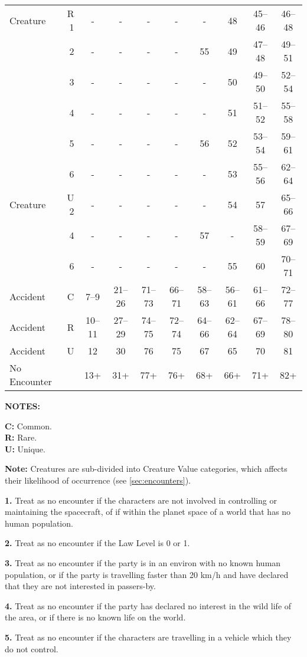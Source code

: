 \begin{table}[htbp]
{\begin{minipage}{5.25in}
\begin{tabular}{lrcccccccc}
\hline
Creature & R 1 & - & - & - & - & - & 48 & 45--46 & 46--48\\
\rowcolor{grey}
& 2 & - & - & - & - & 55 & 49 & 47--48 & 49--51\\
& 3 & - & - & - & - & - & 50 & 49--50 & 52--54\\
\rowcolor{grey}
& 4 & - & - & - & - & - & 51 & 51--52 & 55--58\\
& 5 & - & - & - & - & 56 & 52 & 53--54 & 59--61\\
\rowcolor{grey}
& 6 & - & - & - & - & - & 53 & 55--56 & 62--64\\
\hline
Creature & U 2 & - & - & - & - & - & 54 & 57 & 65--66\\
\rowcolor{grey}
& 4 & - & - & - & - & 57 & - & 58--59 & 67--69\\
& 6 & - & - & - & - & - & 55 & 60 & 70--71\\
\rowcolor{grey}
\hline
Accident\footnotemark[5]& C & 7--9 & 21--26 & 71--73 & 66--71 & 58--63 & 56--61 & 61--66 & 72--77\\
Accident & R & 10--11 & 27--29 & 74--75 & 72--74 & 64--66 & 62--64 & 67--69 & 78--80\\
\rowcolor{grey}
Accident & U & 12 & 30 & 76 & 75 & 67 & 65 & 70 & 81\\
\hline
No Encounter && 13+ & 31+ & 77+ & 76+ & 68+ & 66+ & 71+ & 82+\\
      \end{tabular}

      \medskip

      \parbox{\textwidth}{\textbf{NOTES:}

        \textbf{C:} Common. \\
        \textbf{R:} Rare. \\
        \textbf{U:} Unique. 
        
        \textbf{Note:} Creatures are sub-divided into Creature Value
        categories, which affects their likelihood of occurrence (see
        \ref{sec:encounters}).
        
        \textbf{1.} Treat as no encounter if the characters are not
        involved in controlling or maintaining the spacecraft, of if
        within the planet space of a world that has no human
        population.
        
        \textbf{2.} Treat as no encounter if the Law Level is 0 or 1.
        
        \textbf{3.} Treat as no encounter if the party is in an
        environ with no known human population, or if the party is
        travelling faster than 20 km/h and have declared that they are
        not interested in passers-by.
        
        \textbf{4.} Treat as no encounter if the party has declared no
        interest in the wild life of the area, or if there is no known
        life on the world.
        
        \textbf{5.} Treat as no encounter if the characters are
        travelling in a vehicle which they do not control.}
    \end{minipage}}
\end{table}

